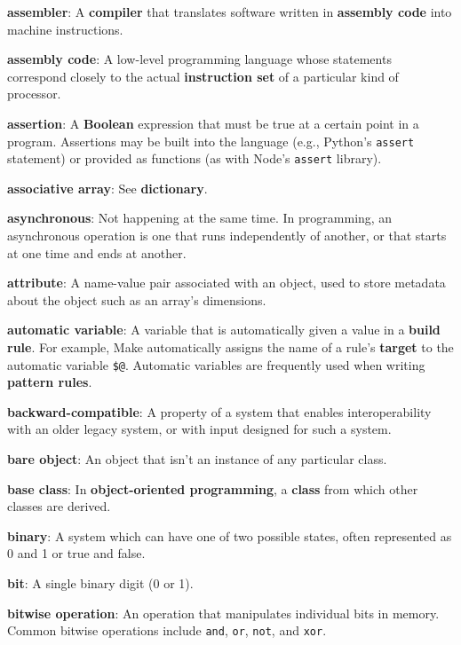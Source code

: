 \documentclass[krantzl]{krantz}
\newcommand{\glosskey}[1]{\textbf{#1}}
\begin{document}
\noindent \textbf{\glosskey{assembler}}: 
A \glosskey{compiler} that translates software written in \glosskey{assembly code} into machine instructions.


\noindent \textbf{\glosskey{assembly code}}: 
A low-level programming language whose statements correspond closely to the actual \glosskey{instruction set} of a particular kind of processor.


\noindent \textbf{\glosskey{assertion}}: 
A \glosskey{Boolean} expression that must be true at a certain point in a program. Assertions may be built into the language (e.g., Python's \texttt{assert} statement) or provided as functions (as with Node's \texttt{assert} library).


\noindent \textbf{\glosskey{associative array}}: 
See \glosskey{dictionary}.


\noindent \textbf{\glosskey{asynchronous}}: 
Not happening at the same time. In programming, an asynchronous operation is one that runs independently of another, or that starts at one time and ends at another.


\noindent \textbf{\glosskey{attribute}}: 
A name-value pair associated with an object, used to store metadata about the object such as an array's dimensions.


\noindent \textbf{\glosskey{automatic variable}}: 
A variable that is automatically given a value in a \glosskey{build rule}. For example, Make automatically assigns the name of a rule's \glosskey{target} to the automatic variable \texttt{\$@}. Automatic variables are frequently used when writing \glosskey{pattern rules}.


\noindent \textbf{\glosskey{backward-compatible}}: 
A property of a system that enables interoperability with an older legacy system, or with input designed for such a system.


\noindent \textbf{\glosskey{bare object}}: 
An object that isn't an instance of any particular class.


\noindent \textbf{\glosskey{base class}}: 
In \glosskey{object-oriented programming}, a \glosskey{class} from which other classes are derived.


\noindent \textbf{\glosskey{binary}}: 
A system which can have one of two possible states, often represented as 0 and 1 or true and false.


\noindent \textbf{\glosskey{bit}}: 
A single binary digit (0 or 1).


\noindent \textbf{\glosskey{bitwise operation}}: 
An operation that manipulates individual bits in memory. Common bitwise operations include \texttt{and}, \texttt{or}, \texttt{not}, and \texttt{xor}.
\end{document}
